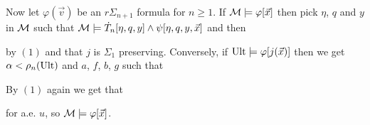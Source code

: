 {\qquad Now let $\varphi(\vec v)$ be an $r\Sigma_{n+1}$ formula for $n\geq 1$. If $\operatorname{\mathcal{M}}\models\varphi[\vec x]$ then pick $\eta$, $q$ and $y$ in $\operatorname{\mathcal{M}}$ such that $\operatorname{\mathcal{M}}\models\dot T_n[\eta,q,y]\land\psi[\eta,q,y,\vec x]$ and then

by $(1)$ and that $j$ is $\Sigma_1$ preserving. Conversely, if $\operatorname{Ult}\models\varphi[j(\vec x)]$ then we get $\alpha<\rho_n(\operatorname{Ult})$ and $a$, $f$, $b$, $g$ such that

By $(1)$ again we get that

for a.e. $u$, so $\operatorname{\mathcal{M}}\models\varphi[\vec x]$.
}


